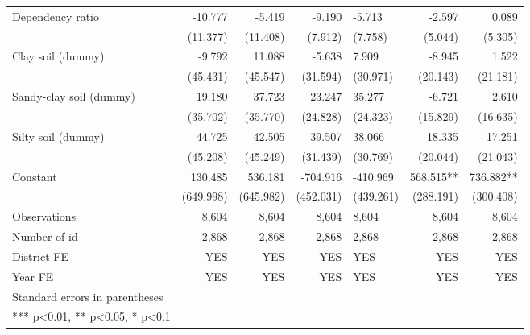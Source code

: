 \documentclass[
]{article}
\begin{document}
\begin{landscape}
\begin{longtable}[t]{lrrrlrr}
Dependency ratio & -10.777 & -5.419 & -9.190 & -5.713 & -2.597 & 0.089\\
\addlinespace
 & (11.377) & (11.408) & (7.912) & (7.758) & (5.044) & (5.305)\\
Clay soil (dummy) & -9.792 & 11.088 & -5.638 & 7.909 & -8.945 & 1.522\\
 & (45.431) & (45.547) & (31.594) & (30.971) & (20.143) & (21.181)\\
Sandy-clay soil (dummy) & 19.180 & 37.723 & 23.247 & 35.277 & -6.721 & 2.610\\
 & (35.702) & (35.770) & (24.828) & (24.323) & (15.829) & (16.635)\\
\addlinespace
Silty soil (dummy) & 44.725 & 42.505 & 39.507 & 38.066 & 18.335 & 17.251\\
 & (45.208) & (45.249) & (31.439) & (30.769) & (20.044) & (21.043)\\
Constant & 130.485 & 536.181 & -704.916 & -410.969 & 568.515** & 736.882**\\
 & (649.998) & (645.982) & (452.031) & (439.261) & (288.191) & (300.408)\\
Observations & 8,604 & 8,604 & 8,604 & 8,604 & 8,604 & 8,604\\
\addlinespace
Number of id & 2,868 & 2,868 & 2,868 & 2,868 & 2,868 & 2,868\\
District FE & YES & YES & YES & YES & YES & YES\\
Year FE & YES & YES & YES & YES & YES & YES\\
Standard errors in parentheses &  &  &  &  &  & \\
*** p<0.01, ** p<0.05, * p<0.1 &  &  &  &  &  & \\*
\end{longtable}
\endgroup{}
\end{landscape}
\newpage
\end{document}
